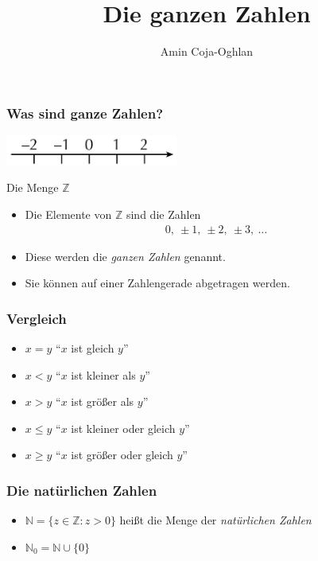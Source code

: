 \documentclass{beamer}
\title[Linadi]{Die ganzen Zahlen}
\author[Amin Coja-Oghlan]{Amin Coja-Oghlan}
\institute[Frankfurt]{Goethe Universit\"at Frankfurt}
\date{}
\renewcommand{\emph}[1]{{\textcolor{solarizedRed}{\itshape #1}}}
\newcommand\NN{\mathbb N}
\newcommand\ZZ{\mathbb Z}
\renewcommand{\oe}{\"o}
\newcommand{\ue}{\"u}
\begin{document}
\frame[plain]{\titlepage}

\begin{frame}\frametitle{Was sind ganze Zahlen?}
	\hfill\includegraphics[height=10mm]{./pics/integers.pdf}
	\begin{block}{Die Menge $\ZZ$}
		\begin{itemize}
			\item Die Elemente von $\ZZ$ sind die Zahlen
				\begin{align*}
					0,\ \pm1,\ \pm2,\ \pm3,\ \ldots
				\end{align*}
			\item Diese werden die \emph{ganzen Zahlen} genannt.
			\item Sie k\oe nnen auf einer Zahlengerade abgetragen werden.
		\end{itemize}
	\end{block}
\end{frame}

\begin{frame}\frametitle{Vergleich}
\begin{block}{}
\begin{itemize}
\item $x=y$ ``$x$ ist gleich $y$''
\item $x<y$ ``$x$ ist kleiner als $y$''
\item $x>y$ ``$x$ ist gr\oe\ss er als $y$''
\item $x\leq y$ ``$x$ ist kleiner oder gleich $y$''
\item $x\geq y$ ``$x$ ist gr\oe\ss er oder gleich $y$''
\end{itemize}
\end{block}
\end{frame}
	
\begin{frame}\frametitle{Die nat\ue rlichen Zahlen}
\begin{itemize}
	\item $\NN=\{z\in\ZZ:z>0\}$ hei\ss t die Menge der \emph{nat\ue rlichen Zahlen}
	\item $\NN_0=\NN\cup\{0\}$
\end{itemize}
\end{frame}
\end{document}
